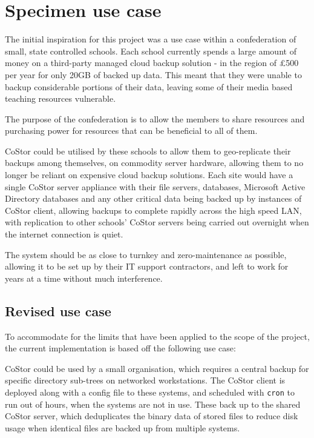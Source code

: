 \documentclass[bsc,frontabs,twoside,singlespacing,parskip,deptreport]{infthesis}     %
\begin{document}
\section{Specimen use case}

The initial inspiration for this project was a use case within a confederation of small, state
controlled schools. Each school currently spends a large amount of money on a third-party 
managed cloud backup solution - in the region of \pounds500 per year for only 20GB of backed
up data. This meant that they were unable to backup considerable portions of their data, leaving
some of their media based teaching resources vulnerable.

The purpose of the confederation is to allow the members to share resources and purchasing power
for resources that can be beneficial to all of them.

CoStor could be utilised by these schools to allow them to geo-replicate their backups among 
themselves, on commodity server hardware, allowing them to no longer be reliant on expensive
cloud backup solutions. Each site would have a single CoStor server appliance with their file
servers, databases, Microsoft Active Directory databases and any other critical data being
backed up by instances of CoStor client, allowing backups to complete rapidly across the high
speed LAN, with replication to other schools' CoStor servers being carried out overnight when 
the internet connection is quiet.

The system should be as close to turnkey and zero-maintenance as possible, allowing it to be
set up by their IT support contractors, and left to work for years at a time without much
interference.

\subsection{Revised use case}

To accommodate for the limits that have been applied to the scope of the project, the current
implementation is based off the following use case:

CoStor could be used by a small organisation, which requires a central backup for specific
directory sub-trees on networked workstations. The CoStor client is deployed along with a
config file to these systems, and scheduled with \texttt{cron} to run out of hours, when the
systems are not in use. These back up to the shared CoStor server, which deduplicates the
binary data of stored files to reduce disk usage when identical files are backed up from
multiple systems.
\end{document}
